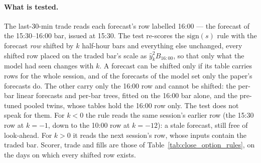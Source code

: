 \paragraph{What is tested.} The last-30-min trade reads each forecast's row labelled 16:00 ---
the forecast of the 15:30--16:00 bar, issued at 15:30. The test re-scores the
$\mathrm{sign}(s)$ rule with the forecast \emph{row} shifted by $k$ half-hour bars and
everything else unchanged, every shifted row placed on the traded bar's scale as
$\hat y_k^{2}B_{16{:}00}$, so that only what the model had seen changes with $k$. A forecast
can be shifted only if its table carries rows for the whole session, and of the \shiftNSet{}
forecasts of the model set only the \shiftNShiftedPaper{} paper's forecasts do. The other
\shiftNNotShifted{} carry only the 16:00 row and cannot be shifted: the
\shiftNNotShiftedPerbarLinear{} per-bar linear forecasts and \shiftNNotShiftedTrees{} per-bar
trees, fitted on the 16:00 bar alone, and the \shiftNNotShiftedPooled{} pre-tuned pooled
twins, whose tables hold the 16:00 row only. The test does not speak for them. For $k<0$ the rule reads the same session's earlier row
(the 15:30 row at $k=-1$, down to the 10:00 row at $k=-12$): a stale forecast, still free of
look-ahead. For $k>0$ it reads the next session's row, whose inputs contain the traded bar.
Scorer, trade and fills are those of Table~\ref{tab:close_option_rules}, on the
\shiftNDays{} days on which every shifted row exists.

